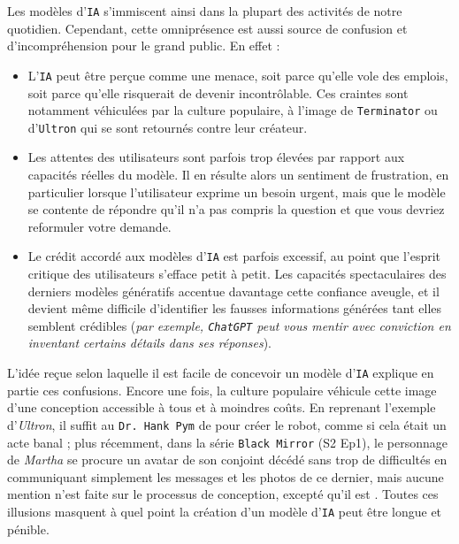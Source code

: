 		Les modèles d'\texttt{IA} s'immiscent ainsi dans la plupart des activités de notre quotidien.
		Cependant, cette omniprésence est aussi source de confusion et d'incompréhension pour le grand public.
		En effet :
		\begin{itemize}
			\item L'\texttt{IA} peut être perçue comme une menace, soit parce qu'elle vole des emplois, soit parce qu'elle risquerait de devenir incontrôlable.
			Ces craintes sont notamment véhiculées par la culture populaire, à l'image de \texttt{Terminator} ou d'\texttt{Ultron} qui se sont retournés contre leur créateur.
			\item Les attentes des utilisateurs sont parfois trop élevées par rapport aux capacités réelles du modèle.
			Il en résulte alors un sentiment de frustration, en particulier lorsque l'utilisateur exprime un besoin urgent, mais que le modèle se contente de répondre qu'il n'a pas compris la question et que vous devriez reformuler votre demande.
			\item Le crédit accordé aux modèles d'\texttt{IA} est parfois excessif, au point que l'esprit critique des utilisateurs s'efface petit à petit.
			Les capacités spectaculaires des derniers modèles génératifs accentue davantage cette confiance aveugle, et il devient même difficile d'identifier les fausses informations générées tant elles semblent crédibles (\textit{par exemple, \texttt{ChatGPT} peut vous mentir avec conviction en inventant certains détails dans ses réponses}). 
		\end{itemize}
		
		L'idée reçue selon laquelle il est facile de concevoir un modèle d'\texttt{IA} explique en partie ces confusions.
		Encore une fois, la culture populaire véhicule cette image d'une conception accessible à tous et à moindres coûts.
		En reprenant l'exemple d'\textit{Ultron}, il suffit au \texttt{Dr. Hank Pym} de  pour créer le robot, comme si cela était un acte banal ; plus récemment, dans la série \texttt{Black Mirror} (S2 Ep1), le personnage de \textit{Martha} se procure un avatar de son conjoint décédé sans trop de difficultés en communiquant simplement les messages et les photos de ce dernier, mais aucune mention n'est faite sur le processus de conception, excepté qu'il est .
		Toutes ces illusions masquent à quel point la création d'un modèle d'\texttt{IA} peut être longue et pénible.
		
